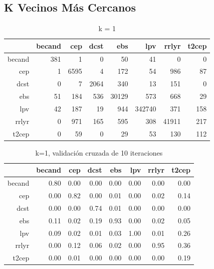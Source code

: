 \documentclass[letterpaper,12pt]{book}
\begin{document}
\subsection{K Vecinos Más Cercanos}
\begin{table}[ht]
  \centering
  \caption{k = 1} 
  \label{table:cmknn}
  \begin{tabular}{rrrrrrrr}
    \hline
    & becand & cep & dcst & ebs & lpv & rrlyr & t2cep \\ 
    \hline
    becand & 381 &   1 &   0 &  50 &  41 &   0 &   0 \\ 
    cep &   1 & 6595 &   4 & 172 &  54 & 986 &  87 \\ 
    dcst &   0 &   7 & 2064 & 340 &  13 & 151 &   0 \\ 
    ebs &  51 & 184 & 536 & 30129 & 573 & 668 &  29 \\ 
    lpv &  42 & 187 &  19 & 944 & 342740 & 371 & 158 \\ 
    rrlyr &   0 & 971 & 165 & 595 & 308 & 41911 & 217 \\ 
    t2cep &   0 &  59 &   0 &  29 &  53 & 130 & 112 \\ 
    \hline
  \end{tabular}
\end{table}

\begin{table}[ht]
  \centering
  \caption{k=1, validación cruzada de 10 iteraciones} 
  \label{table:cmCvKnn}
  \begin{tabular}{rrrrrrrr}
    \hline
    & becand & cep & dcst & ebs & lpv & rrlyr & t2cep \\ 
    \hline
    becand & 0.80 & 0.00 & 0.00 & 0.00 & 0.00 & 0.00 & 0.00 \\ 
    cep & 0.00 & 0.82 & 0.00 & 0.01 & 0.00 & 0.02 & 0.14 \\ 
    dcst & 0.00 & 0.00 & 0.74 & 0.01 & 0.00 & 0.00 & 0.00 \\ 
    ebs & 0.11 & 0.02 & 0.19 & 0.93 & 0.00 & 0.02 & 0.05 \\ 
    lpv & 0.09 & 0.02 & 0.01 & 0.03 & 1.00 & 0.01 & 0.26 \\ 
    rrlyr & 0.00 & 0.12 & 0.06 & 0.02 & 0.00 & 0.95 & 0.36 \\ 
    t2cep & 0.00 & 0.01 & 0.00 & 0.00 & 0.00 & 0.00 & 0.19 \\ 
    \hline
  \end{tabular}
\end{table}
\end{document}
